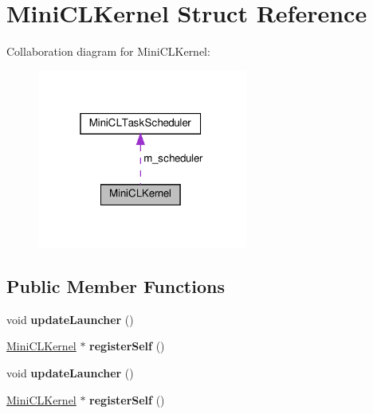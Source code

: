 \hypertarget{structMiniCLKernel}{}\section{Mini\+C\+L\+Kernel Struct Reference}
\label{structMiniCLKernel}


Collaboration diagram for Mini\+C\+L\+Kernel\+:
\nopagebreak
\begin{figure}[H]
\begin{center}
\leavevmode
\includegraphics[width=196pt]{structMiniCLKernel__coll__graph}
\end{center}
\end{figure}
\subsection*{Public Member Functions}
\begin{DoxyCompactItemize}
\item 
\mbox{\label{structMiniCLKernel_aa16abd017bf098ce92951a4a2f88c006}} 
void {\bfseries update\+Launcher} ()
\item 
\mbox{\label{structMiniCLKernel_a4c4943fbd7971911f1c207bdf0079da8}} 
\hyperlink{structMiniCLKernel}{Mini\+C\+L\+Kernel} $\ast$ {\bfseries register\+Self} ()
\item 
\mbox{\label{structMiniCLKernel_aa16abd017bf098ce92951a4a2f88c006}} 
void {\bfseries update\+Launcher} ()
\item 
\mbox{\label{structMiniCLKernel_a3d4b3471df20ca7dfcec6c7e19a816d8}} 
\hyperlink{structMiniCLKernel}{Mini\+C\+L\+Kernel} $\ast$ {\bfseries register\+Self} ()
\end{DoxyCompactItemize}
